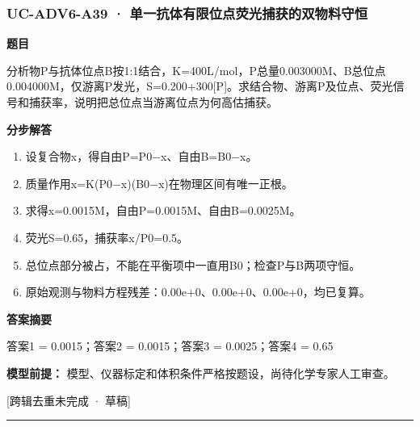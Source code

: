 \documentclass[UTF8,11pt,a4paper]{ctexart}
\begin{document}
\subsubsection*{UC-ADV6-A39 · 单一抗体有限位点荧光捕获的双物料守恒}
\noindent\textbf{题目}\par
分析物P与抗体位点B按1:1结合，K=400L/mol，P总量0.003000M、B总位点0.004000M，仅游离P发光，S=0.200+300[P]。求结合物、游离P及位点、荧光信号和捕获率，说明把总位点当游离位点为何高估捕获。\par
\medskip\noindent\textbf{分步解答}
\begin{enumerate}
\item 设复合物x，得自由P=P0−x、自由B=B0−x。
\item 质量作用x=K(P0−x)(B0−x)在物理区间有唯一正根。
\item 求得x=0.0015M，自由P=0.0015M、自由B=0.0025M。
\item 荧光S=0.65，捕获率x/P0=0.5。
\item 总位点部分被占，不能在平衡项中一直用B0；检查P与B两项守恒。
\item 原始观测与物料方程残差：0.00e+0、0.00e+0、0.00e+0，均已复算。
\end{enumerate}
\noindent\textbf{答案摘要}\par
答案1 = 0.0015；答案2 = 0.0015；答案3 = 0.0025；答案4 = 0.65\par
\noindent\textbf{模型前提：}
模型、仪器标定和体积条件严格按题设，尚待化学专家人工审查。\par
\noindent\textcolor{red!65!black}{[跨辑去重未完成 · 草稿]} \par
\medskip\hrule\medskip
{}
\end{document}
